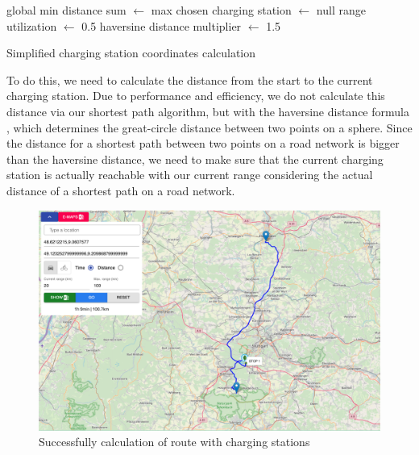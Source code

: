 \documentclass[a4paper]{article}
\begin{document}
\begin{algorithm}[H]
	
	global min distance sum $\leftarrow$ max\;
	chosen charging station $\leftarrow$ null\;
	range utilization $\leftarrow$ 0.5\;
	haversine distance multiplier $\leftarrow$ 1.5\;
	\caption{Simplified charging station coordinates calculation}
	\label{alg:charg}
\end{algorithm}\par\bigskip
To do this, we need to calculate the distance from the start to the current charging station.
Due to performance and efficiency, we do not calculate this distance via our shortest path algorithm, but with the haversine distance formula \cite{10.2307/2309088}, which determines the great-circle distance between two points on a sphere.
Since the distance for a shortest path between two points on a road network is bigger than the haversine distance, we need to make sure that the current charging station is actually reachable with our current range considering the actual distance of a shortest path on a road network.
\begin{figure}[h]
	\centering
	\includegraphics[scale=0.27]{figures/success}
	\caption{Successfully calculation of route with charging stations}
	\label{fig:success}
\end{figure}
\end{document}
